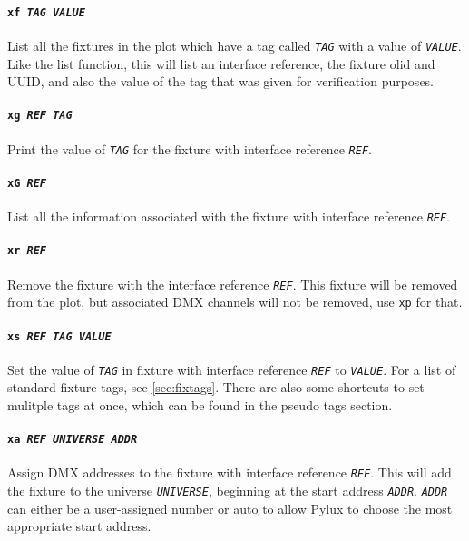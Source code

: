 \documentclass[a4paper]{article}
\begin{document}
\paragraph{\texttt{xf \textit{TAG VALUE}}}
List all the fixtures in the plot which have a tag called 
\texttt{\textit{TAG}} with a value of \texttt{\textit{VALUE}}. Like the list 
function, this will list an interface reference, the fixture olid and UUID, 
and also the value of the tag that was given for verification purposes.

\paragraph{\texttt{xg \textit{REF TAG}}}
Print the value of \texttt{\textit{TAG}} for the fixture with interface
reference \texttt{\textit{REF}}.

\paragraph{\texttt{xG \textit{REF}}}
List all the information associated with the fixture with interface reference 
\texttt{\textit{REF}}.

\paragraph{\texttt{xr \textit{REF}}}
Remove the fixture with the interface reference \texttt{\textit{REF}}. This 
fixture will be removed from the plot, but associated DMX channels will not be 
removed, use \texttt{xp} for that.

\paragraph{\texttt{xs \textit{REF TAG VALUE}}}
Set the value of \texttt{\textit{TAG}} in fixture with interface reference 
\texttt{\textit{REF}} to \texttt{\textit{VALUE}}. For a list of standard 
fixture tags, see \autoref{sec:fixtags}. There are also some shortcuts to set 
mulitple tags at once, which can be found in the pseudo tags section.

\paragraph{\texttt{xa \textit{REF UNIVERSE ADDR}}}
Assign DMX addresses to the fixture with interface reference 
\texttt{\textit{REF}}. This will add the fixture to the universe 
\texttt{\textit{UNIVERSE}}, beginning at the start address 
\texttt{\textit{ADDR}}. \texttt{\textit{ADDR}} can either be a user-assigned 
number or auto to allow Pylux to choose the most appropriate start address.
\end{document}
